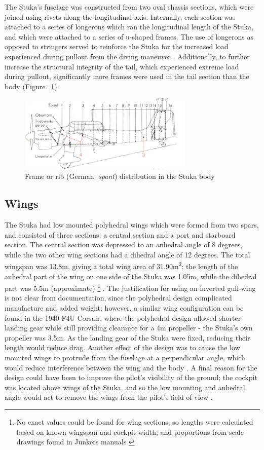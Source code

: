 \documentclass[a4paper, fontsize=11pt]{scrartcl} %
\begin{document}
The Stuka's fuselage was constructed from two oval
chassis sections, which were joined using rivets along the longitudinal
axis.  Internally, each section was attached to a series of longerons
which ran the longitudinal length of the Stuka, and which were attached
to a series of u-shaped frames. The use of longerons as opposed to
stringers served to reinforce the Stuka for the increased load
experienced during pullout from the diving maneuver \autocite{peery12}.
Additionally, to further increase the structural integrity of the tail, which
experienced extreme load during pullout, significantly more frames were
used in the tail section than the body (Figure.~\ref{fig:ribs}).
\begin{figure}[h]
  \centering
  \includegraphics[width=0.75\textwidth]{media/ribbing}
  \caption{Frame or rib (German: \textit{spant}) distribution in the Stuka body \autocite{manual39}}
  \label{fig:ribs}
\end{figure}

\subsection{Wings}
The Stuka had low mounted polyhedral wings which were formed from two spars, and consisted of
three sections; a central section and a port and starboard section. The
central section was depressed to an anhedral angle of 8 degrees, while
the two other wing sections had a dihedral angle of 12
degrees. The total wingspan was 13.8m, giving a total wing area of
31.90m\textsuperscript{2}; the length of the anhedral
part of the wing on one side of the Stuka was 1.05m, while the dihedral part was
5.5m (approximate) 
\footnote{No exact values could be found for wing
  sections, so lengths were calculated based on known wingspan and cockpit
  width, and proportions from scale drawings found in Junkers manuals
  \autocite{manual39}
}
. The justification for using an inverted gull-wing
is not clear from documentation, since the polyhedral
design complicated manufacture and added weight; however, a similar wing
configuration can be found in the 1940 F4U Corsair, where the polyhedral
design allowed shorter landing gear while still providing clearance
for a 4m propeller \autocite{usni} - the Stuka's own propeller was 3.5m.
As the landing gear of the Stuka were fixed, reducing their length would reduce
drag. Another effect of the design was to cause the low
mounted wings to protrude from the fuselage at a perpendicular angle,
which would reduce interference between the wing and the body
\autocite[p~.203]{hartshorn31}. A final reason for the design could have
been to improve the pilot's visibility of the ground; the cockpit was
located above wings of the Stuka, and so the low mounting and
anhedral angle would act to remove the wings from the pilot's field of
view \autocite[p~.16]{guardia14}.
\end{document}
